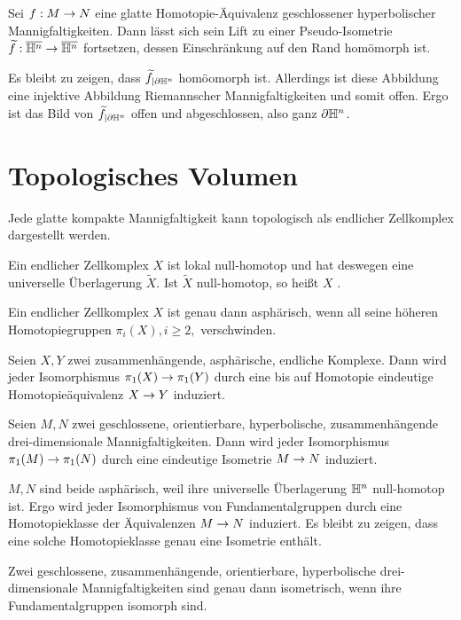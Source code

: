 \documentclass{book}
\begin{document}
\Satz{}
Sei $f : M \overset{}{\rightarrow} N$ eine glatte Homotopie-Äquivalenz geschlossener hyperbolischer Mannigfaltigkeiten. Dann lässt sich sein Lift zu einer Pseudo-Isometrie $\widetilde{f} : \overline{\mathbb{H}^n} \overset{}{\rightarrow}\overline{\mathbb{H}^n}$ fortsetzen, dessen Einschränkung auf den Rand homömorph ist.
\begin{Beweis}{}
	Es bleibt zu zeigen, dass $\widetilde{f}_{|\partial \mathbb{H}^n}$ homöomorph ist. Allerdings ist diese Abbildung eine injektive Abbildung Riemannscher Mannigfaltigkeiten und somit offen. Ergo ist das Bild von $\widetilde{f}_{|\partial \mathbb{H}^n}$ offen und abgeschlossen, also ganz $\partial \mathbb{H}^n$.
\end{Beweis}

\section{Topologisches Volumen}
\Satz{}
Jede glatte kompakte Mannigfaltigkeit kann topologisch als endlicher Zellkomplex dargestellt werden.

\Def{}
Ein endlicher Zellkomplex $X$ ist lokal null-homotop und hat deswegen eine universelle Überlagerung $\widetilde{X}$. Ist $\widetilde{X}$ null-homotop, so heißt $X$ .

Ein endlicher Zellkomplex $X$ ist genau dann asphärisch, wenn all seine höheren Homotopiegruppen $\pi_i(X), i\geq 2,$ verschwinden.

\Satz{}
Seien $X,Y$ zwei zusammenhängende, asphärische, endliche Komplexe. Dann wird jeder Isomorphismus $\pi_1(X) \overset{}{\rightarrow} \pi_1(Y)$ durch eine bis auf Homotopie eindeutige Homotopieäquivalenz $X\overset{}{\rightarrow} Y$ induziert.

\label{MostomTheorem}
Seien $M,N$ zwei geschlossene, orientierbare, hyperbolische, zusammenhängende drei-dimensionale Mannigfaltigkeiten. Dann wird jeder Isomorphismus $\pi_1(M) \overset{}{\rightarrow} \pi_1(N)$ durch eine eindeutige Isometrie $M\overset{}{\rightarrow} N$ induziert.
\begin{Beweis}{}
	$M,N$ sind beide asphärisch, weil ihre universelle Überlagerung $\mathbb{H}^n$ null-homotop ist. Ergo wird jeder Isomorphismus von Fundamentalgruppen durch eine Homotopieklasse der Äquivalenzen $M\overset{}{\rightarrow} N$ induziert. Es bleibt zu zeigen, dass eine solche Homotopieklasse genau eine Isometrie enthält.
\end{Beweis}

\Kor{}
Zwei geschlossene, zusammenhängende, orientierbare, hyperbolische drei-dimensionale Mannigfaltigkeiten sind genau dann isometrisch, wenn ihre Fundamentalgruppen isomorph sind.
\end{document}

